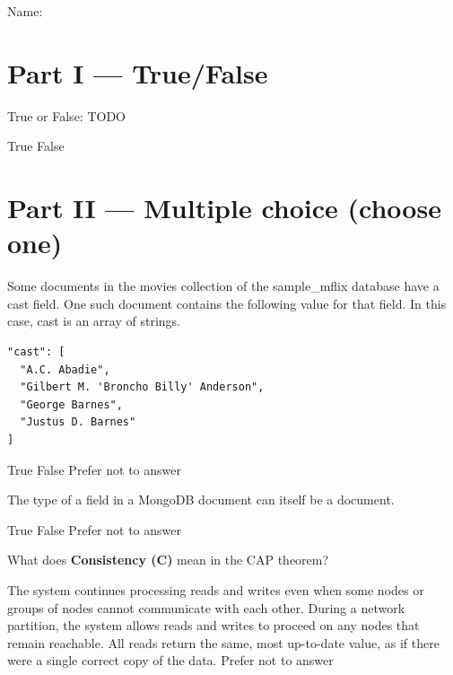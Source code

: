 \documentclass[12pt,answers]{exam}
\begin{document}
\noindent Name:\ \makebox[3in]{\hrulefill}
\begin{questions}

\section*{Part I — True/False}

\begin{minipage}{\linewidth}
\question[2]
True or False: TODO
\begin{checkboxes}
    \CorrectChoice True
    \choice False
\end{checkboxes}
\end{minipage}

\section*{Part II — Multiple choice (choose one)}

\begin{minipage}{\linewidth}
\question[2]
Some documents in the movies collection of the sample\_mflix database have a cast field.
One such document contains the following value for that field.
In this case, cast is an array of strings.
\begin{verbatim}
"cast": [
  "A.C. Abadie",
  "Gilbert M. 'Broncho Billy' Anderson",
  "George Barnes",
  "Justus D. Barnes"
]
\end{verbatim}

\begin{checkboxes}
\CorrectChoice True
\choice False
\choice Prefer not to answer
\end{checkboxes}
\end{minipage}


\begin{minipage}{\linewidth}
\question[2]
The type of a field in a MongoDB document can itself be a document.

\begin{checkboxes}
    \CorrectChoice True
    \choice False
    \choice Prefer not to answer
\end{checkboxes}
\end{minipage}

\begin{minipage}{\linewidth}
\question[2]
What does \textbf{Consistency (C)} mean in the CAP theorem?

\begin{checkboxes}
    \choice The system continues processing reads and writes even when some nodes or groups of nodes cannot communicate with each other.
    \choice During a network partition, the system allows reads and writes to proceed on any nodes that remain reachable.
    \CorrectChoice All reads return the same, most up-to-date value, as if there were a single correct copy of the data.
    \choice Prefer not to answer
\end{checkboxes}
\end{minipage}



\end{questions}
\end{document}
